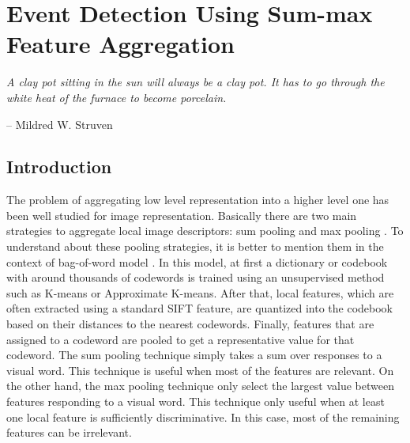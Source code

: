 
\chapter{Event Detection Using Sum-max Feature Aggregation}
\label{chapter4}
\epigraph{\textit{A clay pot sitting in the sun will always be a clay pot. It has to go through the white heat of the furnace to become porcelain.}}{ -- Mildred W. Struven}

\ifpdf
    \graphicspath{{Chapter4/Figs/Raster/}{Chapter4/Figs/PDF/}{Chapter4/Figs/}}
\else
    \graphicspath{{Chapter4/Figs/Vector/}{Chapter4/Figs/}}
\fi

\section{Introduction}
\label{sec:intro}

The problem of aggregating low level representation into a higher level one has been well studied for image representation. Basically there are two main strategies to aggregate local image descriptors: sum pooling \cite{Koenderink:1999} and max pooling \cite{Serre05objectrecognition}. To understand about these pooling strategies, it is better to mention them in the context of bag-of-word model \cite{Csurka04visualcategorization}. In this model, at first a dictionary or codebook with around thousands of codewords is trained using an unsupervised method such as K-means or Approximate K-means. After that, local features, which are often extracted using a standard SIFT \cite{Lowe:2004} feature, are quantized into the codebook based on their distances to the nearest codewords. Finally, features that are assigned to a codeword are pooled to get a representative value for that codeword. The sum pooling technique simply takes a sum over responses to a visual word. This technique is useful when most of the features are relevant. On the other hand, the max pooling technique only select the largest value between features responding to a visual word. This technique only useful when at least one local feature is sufficiently discriminative. In this case, most of the remaining features can be irrelevant. 

